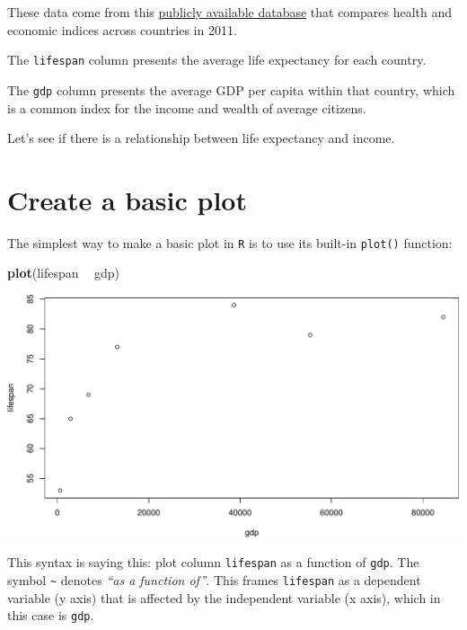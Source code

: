\documentclass[]{book}
\newenvironment{Shaded}{\begin{snugshade}}{\end{snugshade}}
\newcommand{\KeywordTok}[1]{\textcolor[rgb]{0.13,0.29,0.53}{\textbf{#1}}}
\newcommand{\NormalTok}[1]{#1}
\newcommand{\OperatorTok}[1]{\textcolor[rgb]{0.81,0.36,0.00}{\textbf{#1}}}
\newcommand{\StringTok}[1]{\textcolor[rgb]{0.31,0.60,0.02}{#1}}
\begin{document}
These data come from this \href{https://datasets.iisg.amsterdam/dataset.xhtml?persistentId=hdl:10622/LKYT53}{publicly available database} that compares health and economic indices across countries in 2011.

The \texttt{lifespan} column presents the average life expectancy for each country.

The \texttt{gdp} column presents the average GDP per capita within that country, which is a common index for the income and wealth of average citizens.

Let's see if there is a relationship between life expectancy and income.

\hypertarget{create-a-basic-plot}{%
\section*{Create a basic plot}\label{create-a-basic-plot}}

The simplest way to make a basic plot in \texttt{R} is to use its built-in \texttt{plot()} function:

\begin{Shaded}
\begin{Highlighting}[]
\KeywordTok{plot}\NormalTok{(lifespan }\OperatorTok{~}\StringTok{ }\NormalTok{gdp)}
\end{Highlighting}
\end{Shaded}

\includegraphics{figures/unnamed-chunk-221-1.pdf}

This syntax is saying this: plot column \texttt{lifespan} as a function of \texttt{gdp}. The symbol \texttt{\textasciitilde{}} denotes \emph{``as a function of''}. This frames \texttt{lifespan} as a dependent variable (y axis) that is affected by the independent variable (x axis), which in this case is \texttt{gdp}.
\end{document}

